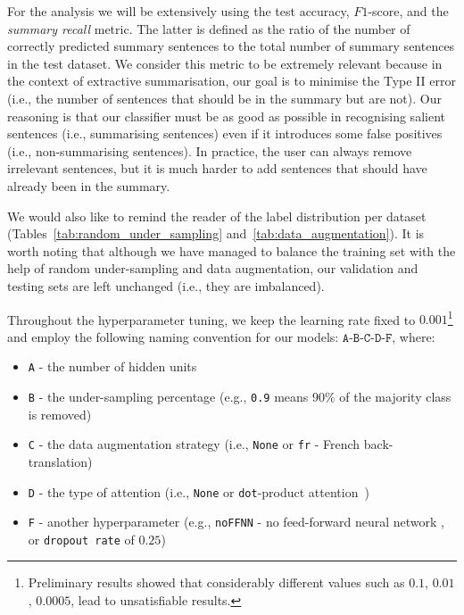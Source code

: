For the analysis we will be extensively using the test accuracy, $F1$-score, and the \emph{summary recall} metric.
The latter is defined as the ratio of the number of correctly predicted summary sentences to the total number of summary sentences in the test dataset.
We consider this metric to be extremely relevant because in the context of extractive summarisation, our goal is to minimise the Type II error (i.e., the number of sentences that should be in the summary but are not).
Our reasoning is that our classifier must be as good as possible in recognising salient sentences (i.e., summarising sentences) even if it introduces some false positives (i.e., non-summarising sentences).
In practice, the user can always remove irrelevant sentences, but it is much harder to add sentences that should have already been in the summary.

We would also like to remind the reader of the label distribution per dataset (Tables~\ref{tab:random_under_sampling} and~\ref{tab:data_augmentation}).
It is worth noting that although we have managed to balance the training set with the help of random under-sampling and data augmentation,
our validation and testing sets are left unchanged (i.e., they are imbalanced).

Throughout the hyperparameter tuning, we keep the learning rate fixed to $0.001$\footnote{
    Preliminary results showed that considerably different values such as $0.1$, $0.01$, $0.0005$, lead to unsatisfiable results.
} and employ the following naming convention for our models: $\texttt{A-B-C-D-F}$, where:
\begin{itemize}
    \item \texttt{A} - the number of hidden units
    \item \texttt{B} - the under-sampling percentage (e.g., \texttt{0.9} means 90\% of the majority class is removed)
    \item \texttt{C} - the data augmentation strategy (i.e., \texttt{None} or \texttt{fr} - French back-translation)
    \item \texttt{D} - the type of attention (i.e., \texttt{None} or \texttt{dot}-product attention~\cite{vaswani2017attention})
    \item \texttt{F} - another hyperparameter (e.g., \texttt{noFFNN} - no feed-forward neural network , or \texttt{dropout rate} of $0.25$)
\end{itemize}


